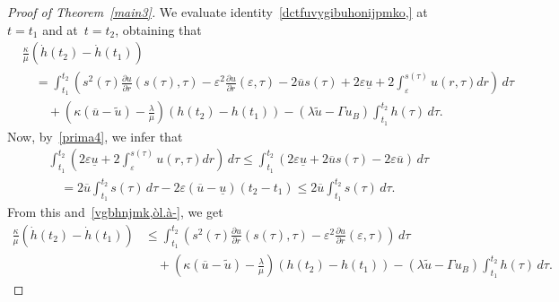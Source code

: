 \documentclass[12pt,a4paper,intlimits,sumlimits]{amsart}
\theoremstyle{definition}
\theoremstyle{plain}
\numberwithin{equation}{section}
\renewcommand{\le}{\leqslant}
\begin{document}
\begin{proof}[Proof of Theorem~\ref{main3}]
We evaluate identity~\eqref{dctfuvygibuhonijpmko,} at $t=t_1$ and at~$t=t_2$,
obtaining that
\begin{equation}\label{vgbhnjmk,òl.à-}
\begin{split}
&\frac{\kappa}{\mu}\left(\dot h(t_2)-\dot h(t_1)\right)\\
&\quad=\int_{t_1}^{t_2}\left(s^2(\tau)\frac{\partial u}{\partial r}(s(\tau),\tau)-\varepsilon^2\frac{\partial u}{\partial r}(\varepsilon,\tau)-2\overline{u}s(\tau)+2\varepsilon \underline{u} +2\int_\varepsilon^{s(\tau)}u(r,\tau)dr\right) \,d\tau \\
&\qquad +\left(\kappa(\overline{u}-\widetilde u)-\frac{\lambda}{\mu}\right)(h(t_2)-h(t_1))-(\lambda\widetilde u -\Gamma u_B) \int_{t_1}^{t_2} h(\tau)\,d\tau.
\end{split}
\end{equation}
Now, by~\eqref{prima4}, we infer that
\[
\begin{split}
&\int_{t_1}^{t_2} \left(2\varepsilon \underline{u} +2\int_\varepsilon^{s(\tau)}u(r,\tau)dr\right) \,d\tau\le \int_{t_1}^{t_2} \left(2\varepsilon \underline{u} +2\overline{u} s(\tau) -2\varepsilon\overline{u}\right) \,d\tau\\
&\quad= 2\overline{u} \int_{t_1}^{t_2} s(\tau) \,d\tau -2\varepsilon(\overline u-\underline u)(t_2-t_1)\le 2\overline{u} \int_{t_1}^{t_2} s(\tau) \,d\tau.
\end{split}
\]
From this and~\eqref{vgbhnjmk,òl.à-}, we get
\begin{equation}\label{ctvtybuhinjmokp,l.ò}
\begin{split}
\frac{\kappa}{\mu}\left(\dot h(t_2)-\dot h(t_1)\right)&\le\int_{t_1}^{t_2}\left(s^2(\tau)\frac{\partial u}{\partial r}(s(\tau),\tau)-\varepsilon^2\frac{\partial u}{\partial r}(\varepsilon,\tau)\right) \,d\tau \\
&\quad +\left(\kappa(\overline{u}-\widetilde u)-\frac{\lambda}{\mu}\right)(h(t_2)-h(t_1))-(\lambda\widetilde u -\Gamma u_B) \int_{t_1}^{t_2} h(\tau)\,d\tau.
\end{split}
\end{equation}


\end{proof}
\end{document}
